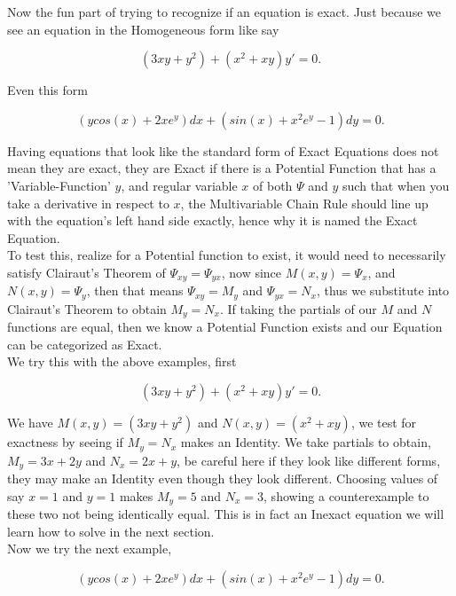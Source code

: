 \documentclass[12pt]{article}
\begin{document}
Now the fun part of trying to recognize if an equation is exact. Just because we see an equation in the Homogeneous form like say

\begin{equation*}
    (3xy+y^2) + (x^2+xy)y'=0.
\end{equation*}

Even this form

\begin{equation*}
    (ycos(x)+2xe^y)dx+(sin(x)+x^2e^y-1)dy=0.
\end{equation*}

Having equations that look like the standard form of Exact Equations does not mean they are exact, they are Exact if there is a Potential Function that has a 'Variable-Function' $y$, and regular variable $x$ of both $\Psi$ and $y$ such that when you take a derivative in respect to $x$, the Multivariable Chain Rule should line up with the equation's left hand side exactly, hence why it is named the Exact Equation. \\

To test this, realize for a Potential function to exist, it would need to necessarily satisfy Clairaut's Theorem of $\Psi_{xy}=\Psi_{yx}$, now since $M(x,y) = \Psi_x$, and $N(x,y) = \Psi_y$, then that means $\Psi_{xy}=M_y$ and $\Psi_{yx}=N_x$, thus we substitute into Clairaut's Theorem to obtain $M_y=N_x$. If taking the partials of our $M$ and $N$ functions are equal, then we know a Potential Function exists and our Equation can be categorized as Exact. \\

We try this with the above examples, first

\begin{equation*}
    (3xy+y^2) + (x^2+xy)y'=0.
\end{equation*}

We have $M(x,y)=(3xy+y^2)$ and $N(x,y)=(x^2+xy)$, we test for exactness by seeing if $M_y=N_x$ makes an Identity. We take partials to obtain, $M_y=3x+2y$ and $N_x=2x+y$, be careful here if they look like different forms, they may make an Identity even though they look different. Choosing values of say $x=1$ and $y=1$ makes $M_y=5$ and $N_x=3$, showing a counterexample to these two not being identically equal. This is in fact an Inexact equation we will learn how to solve in the next section. \\

Now we try the next example,

\begin{equation*}
    (ycos(x)+2xe^y)dx+(sin(x)+x^2e^y-1)dy=0.
\end{equation*}
\end{document}
